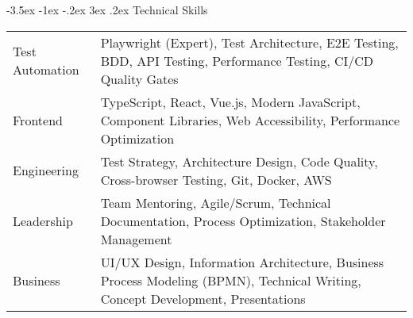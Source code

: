 \documentclass[11pt,a4paper]{article}
\makeatletter
\renewcommand\section{\@startsection{section}{1}{\z@}%
    {-3.5ex \@plus -1ex \@minus -.2ex}%
    {3ex \@plus.2ex}%
    {\Large\sffamily\bfseries\color{primary}}}
\makeatother
\begin{document}
\section{Technical Skills}
\begin{tabularx}{\textwidth}{@{}l X@{}}
Test Automation & Playwright (Expert), Test Architecture, E2E Testing, BDD, API Testing, Performance Testing, CI/CD Quality Gates\\[0.8em]
Frontend & TypeScript, React, Vue.js, Modern JavaScript, Component Libraries, Web Accessibility, Performance Optimization\\[0.8em]
Engineering & Test Strategy, Architecture Design, Code Quality, Cross-browser Testing, Git, Docker, AWS\\[0.8em]
Leadership & Team Mentoring, Agile/Scrum, Technical Documentation, Process Optimization, Stakeholder Management\\[0.8em]
Business & UI/UX Design, Information Architecture, Business Process Modeling (BPMN), Technical Writing, Concept Development, Presentations
\end{tabularx}
\end{document}
